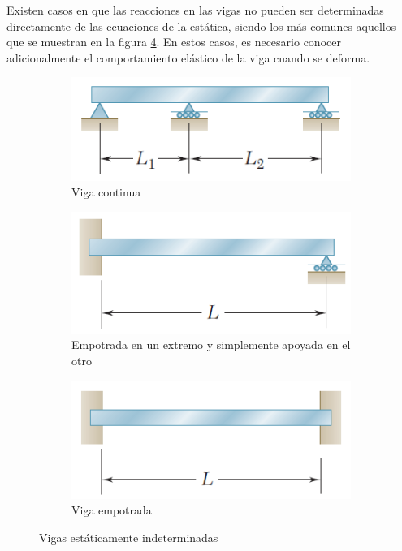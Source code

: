 \documentclass[12pt,letterpaper]{article}
\begin{document}
Existen casos en que las reacciones en las vigas no pueden ser determinadas directamente de las 
ecuaciones de la estática, siendo los más comunes aquellos que se muestran en la figura 
\ref{fig:vigas_indeterminadas}. En estos casos, es necesario conocer adicionalmente el comportamiento 
elástico de la viga cuando se deforma.


\begin{figure}[H]
    \centering
    \begin{subfigure}[H]{0.3\textwidth}
        \includegraphics[width=\textwidth]{img/continua.PNG}
        \caption{Viga continua}
        \label{fig:gull}
    \end{subfigure}
    \begin{subfigure}[H]{0.3\textwidth}
        \includegraphics[width=\textwidth]{img/empotrada_apoyada.PNG}
        \caption{Empotrada en un extremo y simplemente apoyada en el otro}
        \label{fig:tiger}
    \end{subfigure}
    \begin{subfigure}[H]{0.3\textwidth}
        \includegraphics[width=\textwidth]{img/empotrada_doble.PNG}
        \caption{Viga empotrada}
        \label{fig:mouse}
    \end{subfigure}
    \caption{Vigas estáticamente indeterminadas}
    \label{fig:vigas_indeterminadas}
\end{figure}
\end{document}
